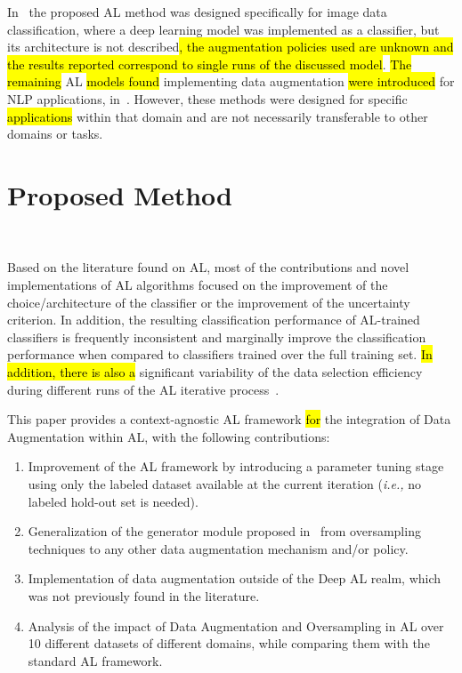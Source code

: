 \documentclass[preprint, 12pt]{elsarticle}
\begin{document}
In~\cite{Ma2020} the proposed AL method was designed specifically for image
data classification, where a deep learning model was implemented as a
classifier, but its architecture is not described\hl{, the augmentation
policies used are unknown and the results reported correspond to single runs
of the discussed model}. \hl{The remaining} AL \hl{models found} implementing
data augmentation \hl{were introduced} for NLP applications,
in~\cite{Quteineh2020, Li2021framework}. However, these methods were designed
for specific \hl{applications} within that domain and are not necessarily
transferable to other domains or tasks.

\section{Proposed Method}~\label{sec:proposed_method}

Based on the literature found on AL, most of the contributions and novel
implementations of AL algorithms focused on the improvement of the
choice/architecture of the classifier or the improvement of the uncertainty
criterion. In addition, the resulting classification performance of AL-trained
classifiers is frequently inconsistent and marginally improve the
classification performance when compared to classifiers trained over the full
training set. \hl{In addition, there is also a} significant variability of the
data selection efficiency during different runs of the AL iterative
process~\cite{Fonseca2021}.  


 
This paper provides a context-agnostic AL framework \hl{for} the integration
of Data Augmentation within AL, with the following contributions:

\begin{enumerate}
    \item Improvement of the AL framework by introducing a parameter tuning
        stage using only the labeled dataset available at the current
        iteration (\textit{i.e.,} no labeled hold-out set is needed).
    \item Generalization of the generator module proposed
        in~\cite{Fonseca2021} from oversampling techniques to any other data
        augmentation mechanism and/or policy.
    \item Implementation of data augmentation outside of the Deep AL realm,
        which was not previously found in the literature.
    \item Analysis of the impact of Data Augmentation and Oversampling in AL
        over 10 different datasets of different domains, while comparing them
        with the standard AL framework.
\end{enumerate}
\end{document}
